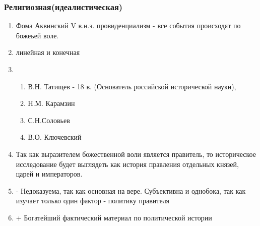 \documentclass[a4paper]{article}
\begin{document}
\subsubsection{Религиозная(идеалистическая)}
\begin{enumerate}
    \item Фома Аквинский V в.н.э.
    провиденциализм - все события происходят по божеьей воле.
    \item линейная и конечная
    \item
    \begin{enumerate}
        \item В.Н. Татищев - 18 в. (Основатель российской исторической науки),
        \item Н.М. Карамзин
        \item С.Н.Соловьев
        \item В.О. Ключевский
    \end{enumerate}
    \item Так как выразителем божественной воли является правитель, то историческое исследование будет выглядеть как история правления отдельных князей, царей и императоров.
    \item - Недоказуема, так как основная на вере. Субъективна и однобока, так как изучает только один фактор - политику правителя
    \item + Богатейший фактический материал по политической истории
\end{enumerate}
\end{document}
